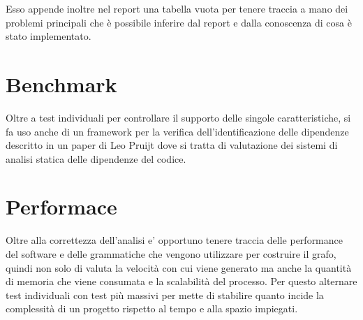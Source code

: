 
Esso appende inoltre nel report una tabella vuota per tenere traccia a mano dei problemi principali che \`e possibile inferire dal report e dalla conoscenza di cosa \`e stato implementato.


\section{Benchmark}

Oltre a test individuali per controllare il supporto delle singole caratteristiche, si fa uso anche di un framework per la verifica dell'identificazione delle dipendenze descritto in un paper di Leo Pruijt \cite{DBLP:journals/spe/PruijtKWB17} dove si tratta di valutazione dei sistemi di analisi statica delle dipendenze del codice.



\section{Performace}

Oltre alla correttezza dell'analisi e' opportuno tenere traccia delle performance del software e delle grammatiche che vengono utilizzare per costruire il grafo, quindi non solo di valuta la velocit\`a con cui viene generato ma anche la quantit\`a di memoria che viene consumata e la scalabilit\`a del processo.
Per questo alternare test individuali con test pi\`u massivi per mette di stabilire quanto incide la complessit\`a di un progetto rispetto al tempo e alla spazio impiegati.
